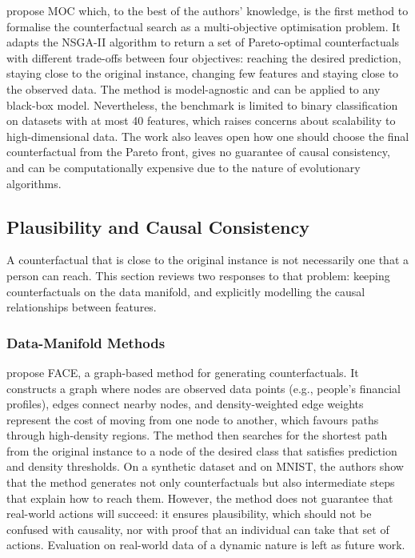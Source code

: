 \citet{dandl2020multiobjective} propose MOC which, to the best of the authors' knowledge, is the first
method to formalise the counterfactual search as a multi-objective optimisation problem. It adapts the
NSGA-II algorithm to return a set of Pareto-optimal counterfactuals with different trade-offs between
four objectives: reaching the desired prediction, staying close to the original instance, changing few
features and staying close to the observed data. The method is model-agnostic and can be applied to any
black-box model. Nevertheless, the benchmark is limited to binary classification on datasets with at
most 40 features, which raises concerns about scalability to high-dimensional data. The work also leaves
open how one should choose the final counterfactual from the Pareto front, gives no guarantee of causal
consistency, and can be computationally expensive due to the nature of evolutionary algorithms.

\subsection{Plausibility and Causal Consistency}
\label{sec:lr-plausibility}
A counterfactual that is close to the original instance is not necessarily one that a person can reach.
This section reviews two responses to that problem: keeping counterfactuals on the data manifold, and
explicitly modelling the causal relationships between features.

\subsubsection{Data-Manifold Methods}
\label{subsec:lr-data-manifold}
\citet{poyiadzi2020face} propose FACE, a graph-based method for generating counterfactuals. It constructs
a graph where nodes are observed data points (e.g., people's financial profiles), edges connect nearby
nodes, and density-weighted edge weights represent the cost of moving from one node to another, which
favours paths through high-density regions. The method then searches for the shortest path from the
original instance to a node of the desired class that satisfies prediction and density thresholds. On a
synthetic dataset and on MNIST, the authors show that the method generates not only counterfactuals but
also intermediate steps that explain how to reach them. However, the method does not guarantee that
real-world actions will succeed: it ensures plausibility, which should not be confused with causality,
nor with proof that an individual can take that set of actions. Evaluation on real-world data of a
dynamic nature is left as future work.

